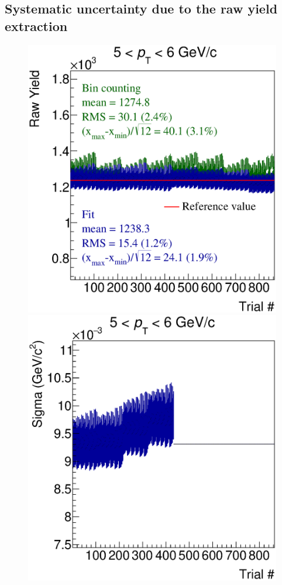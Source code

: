 \documentclass[b5paper,10pt,twoside,oldstyle,classica]{toptesi}
\begin{document}
\subsection{Systematic uncertainty due to the raw yield extraction}
\begin{figure}[b]
\begin{center}
{\includegraphics[scale = 0.31]{RawVsTrial_Pt4.eps}}
\hspace{-0.5cm}
{\includegraphics[scale = 0.31]{SigmaVsTrial_Pt4.eps}}

\end{center}
\end{figure}
\end{document}
